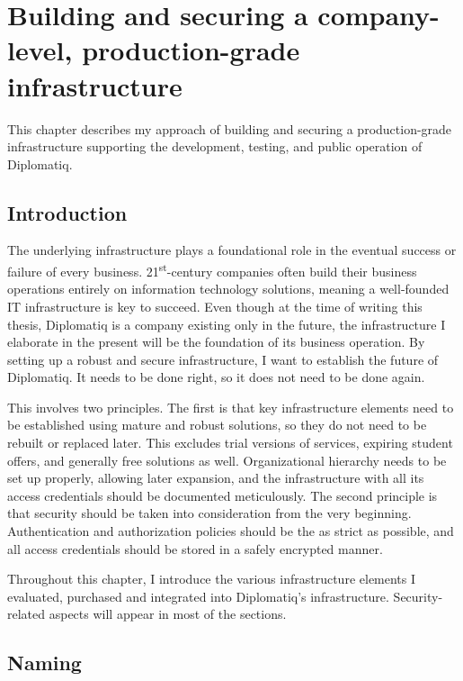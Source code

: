 \chapter{Building and securing a company-level, production-grade infrastructure}
\label{chapter:infrastructure}

This chapter describes my approach of building and securing a production-grade infrastructure supporting the development, testing, and public operation of Diplomatiq.

\section{Introduction}

The underlying infrastructure plays a foundational role in the eventual success or failure of every business. 21\textsuperscript{st}-century companies often build their business operations entirely on information technology solutions, meaning a well-founded IT infrastructure is key to succeed. Even though at the time of writing this thesis, Diplomatiq is a company existing only in the future, the infrastructure I elaborate in the present will be the foundation of its business operation. By setting up a robust and secure infrastructure, I want to establish the future of Diplomatiq. It needs to be done right, so it does not need to be done again.

This involves two principles. The first is that key infrastructure elements need to be established using mature and robust solutions, so they do not need to be rebuilt or replaced later. This excludes trial versions of services, expiring student offers, and generally free solutions as well. Organizational hierarchy needs to be set up properly, allowing later expansion, and the infrastructure with all its access credentials should be documented meticulously. The second principle is that security should be taken into consideration from the very beginning. Authentication and authorization policies should be the as strict as possible, and all access credentials should be stored in a safely encrypted manner.

Throughout this chapter, I introduce the various infrastructure elements I evaluated, purchased and integrated into Diplomatiq's infrastructure. Security-related aspects will appear in most of the sections.

\section{Naming}
\label{section:naming}

